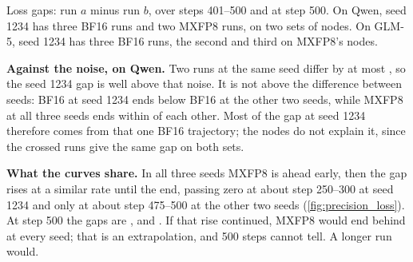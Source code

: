 \begin{table}[h]
  \caption{Loss gaps: run $a$ minus run $b$, over steps 401--500 and at step 500. On Qwen, seed 1234 has three BF16 runs and two MXFP8 runs, on two sets of nodes. On GLM-5, seed 1234 has three BF16 runs, the second and third on MXFP8's nodes.}
  \label{tab:loss_gaps}
  \centering\small
  \begin{adjustbox}{max width=\linewidth}
  \end{adjustbox}
\end{table}

\textbf{Against the noise, on Qwen.} Two runs at the same seed differ by at most \TriLossSameMax, so the seed 1234 gap is well above that noise. It is not above the difference between seeds: BF16 at seed 1234 ends \TriLossOtherMax{} below BF16 at the other two seeds, while MXFP8 at all three seeds ends within \TriLossOtherMxMax{} of each other. Most of the gap at seed 1234 therefore comes from that one BF16 trajectory; the nodes do not explain it, since the crossed runs give the same gap on both sets.

\textbf{What the curves share.} In all three seeds MXFP8 is ahead early, then the gap rises at a similar rate until the end, passing zero at about step 250--300 at seed 1234 and only at about step 475--500 at the other two seeds (\cref{fig:precision_loss}). At step 500 the gaps are \TriLossSeedOneEnd, \TriLossSeedTwoEnd{} and \TriLossSeedThreeEnd. If that rise continued, MXFP8 would end behind at every seed; that is an extrapolation, and 500 steps cannot tell. A longer run would.

